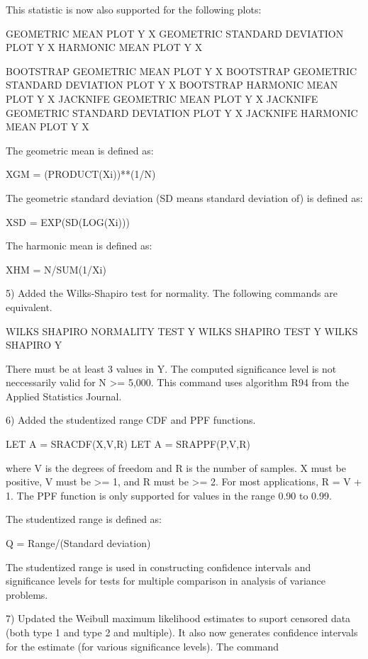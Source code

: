 {    This statistic is now also supported for the following plots:

       GEOMETRIC MEAN PLOT Y X
       GEOMETRIC STANDARD DEVIATION PLOT Y X
       HARMONIC MEAN PLOT Y X

       BOOTSTRAP GEOMETRIC MEAN PLOT Y X
       BOOTSTRAP GEOMETRIC STANDARD DEVIATION PLOT Y X
       BOOTSTRAP HARMONIC MEAN PLOT Y X
       JACKNIFE GEOMETRIC MEAN PLOT Y X
       JACKNIFE GEOMETRIC STANDARD DEVIATION PLOT Y X
       JACKNIFE HARMONIC MEAN PLOT Y X

    The geometric mean is defined as:

       XGM = (PRODUCT(Xi))**(1/N)

    The geometric standard deviation (SD means standard deviation of)
    is defined as:

       XSD = EXP(SD(LOG(Xi)))

    The harmonic mean is defined as:

       XHM = N/SUM(1/Xi)

 5) Added the Wilks-Shapiro test for normality.  The following
    commands are equivalent.

       WILKS SHAPIRO NORMALITY TEST Y
       WILKS SHAPIRO TEST Y
       WILKS SHAPIRO Y

    There must be at least 3 values in Y.  The computed significance
    level is not neccessarily valid for N >= 5,000.  This command
    uses algorithm R94 from the Applied Statistics Journal.

 6) Added the studentized range CDF and PPF functions.

       LET A = SRACDF(X,V,R)
       LET A = SRAPPF(P,V,R)

    where V is the degrees of freedom and R is the number of
    samples.  X must be positive, V must be >= 1, and 
    R must be >= 2.  For most applications, R = V + 1.  The PPF
    function is only supported for values in the range 0.90 to 0.99.

    The studentized range is defined as:

       Q = Range/(Standard deviation)

    The studentized range is used in constructing confidence intervals
    and significance levels for tests for multiple comparison in
    analysis of variance problems.

 7) Updated the Weibull maximum likelihood estimates to suport
    censored data (both type 1 and type 2 and multiple).  It also now
    generates confidence intervals for the estimate (for various
    significance levels).  The command

}
